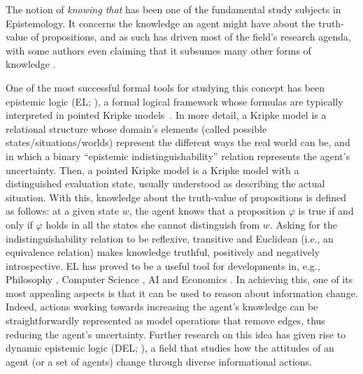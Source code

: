 \begin{textonuevo}
The notion of \emph{knowing that} has been one of the fundamental study subjects in Epistemology. It concerns the knowledge an agent might have about the truth-value of propositions, and as such has driven most of the field's research agenda, with some authors even claiming that it subsumes many other forms of knowledge \cite{BoenLycan75}. 
 
One of the most successful formal tools for studying this concept has been epistemic logic (EL; \cite{Hintikka:kab}), a formal logical framework whose formulas are typically interpreted in pointed Kripke models~\cite{mlbook,HML}. In more detail, a Kripke model is a relational structure whose domain's elements (called possible states/situations/worlds) represent the different ways the real world can be, and in which a binary ``epistemic indistinguishability'' relation represents the agent's uncertainty. Then, a pointed Kripke model is a Kripke model with a distinguished evaluation state, usually understood as describing the actual situation. With this, knowledge about the truth-value of propositions is defined as follows: at a given state $w$, the agent knows that a proposition $\varphi$ is true if and only if $\varphi$ holds in all the states she cannot distinguish from $w$. Asking for the indistinguishability relation to be reflexive, transitive and Euclidean (i.e., an equivalence relation) makes knowledge truthful, positively and negatively introspective. EL has proved to be a useful tool for developments in, e.g., Philosophy \cite{rfe,Holliday2018}, Computer Science \cite{RAK}, AI \cite{elfaics} and Economics \cite{egepgt}. In achieving this, one of its most appealing aspects is that it can be used to reason about information change. Indeed, actions working towards increasing the agent's knowledge can be straightforwardly represented as model operations that remove edges, thus reducing the agent's uncertainty. Further research on this idea has given rise to dynamic epistemic logic (DEL; \cite{DELbook,vanBenthem2011ldii}), a field that studies how the attitudes of an agent (or a set of agents) change through diverse informational actions. 

\smallskip


\end{textonuevo}
